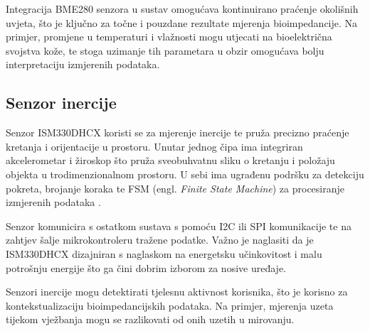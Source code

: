 \documentclass[../diplomski_rad.tex]{subfiles}
\begin{document}
Integracija BME280 senzora u sustav omogućava kontinuirano praćenje okolišnih uvjeta, 
što je ključno za točne i pouzdane rezultate mjerenja bioimpedancije. 
Na primjer, promjene u temperaturi i vlažnosti mogu utjecati na bioelektrična svojstva kože, 
te stoga uzimanje tih parametara u obzir omogućava bolju interpretaciju izmjerenih podataka.

\subsection{Senzor inercije}

Senzor ISM330DHCX koristi se za mjerenje inercije te pruža precizno praćenje kretanja i orijentacije u prostoru.
Unutar jednog čipa ima integriran akcelerometar i žiroskop što pruža sveobuhvatnu sliku o kretanju 
i položaju objekta u trodimenzionalnom  prostoru. U sebi ima ugrađenu podršku za detekciju pokreta, brojanje koraka te 
FSM (engl. \textit{Finite State Machine}) za procesiranje izmjerenih podataka \cite{ism330dhcx}. 

Senzor komunicira s ostatkom sustava s pomoću I2C ili SPI komunikacije te na zahtjev šalje mikrokontroleru tražene podatke.
Važno je naglasiti da je ISM330DHCX dizajniran s naglaskom na energetsku učinkovitost i malu potrošnju energije 
što ga čini dobrim izborom za nosive uređaje.

Senzori inercije mogu detektirati tjelesnu aktivnost korisnika, što je korisno za kontekstualizaciju bioimpedancijskih podataka. 
Na primjer, mjerenja uzeta tijekom vježbanja mogu se razlikovati od onih uzetih u mirovanju.
\end{document}
